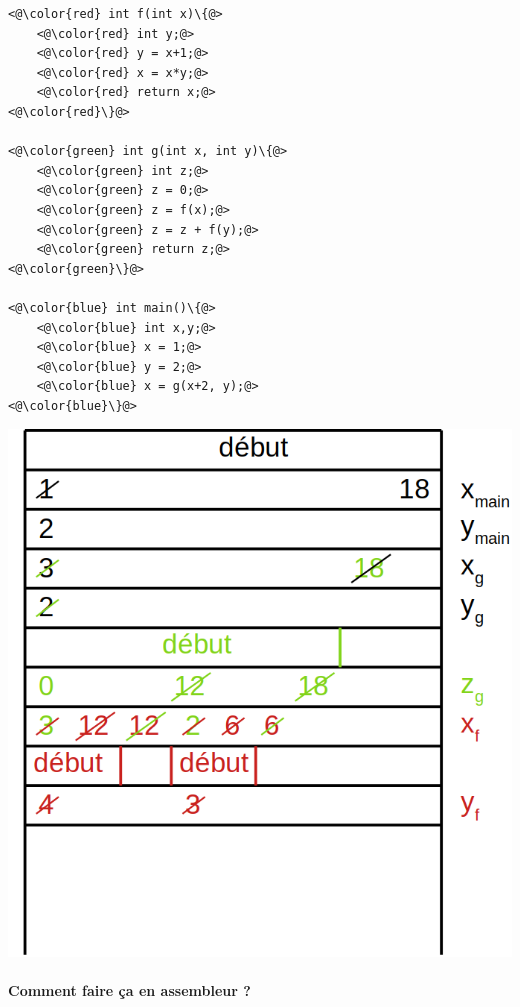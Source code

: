 \begin{minipage}{0.25\linewidth}
\begin{lstlisting}
<@\color{red} int f(int x)\{@>
    <@\color{red} int y;@>
    <@\color{red} y = x+1;@>
    <@\color{red} x = x*y;@>
    <@\color{red} return x;@>
<@\color{red}\}@>

<@\color{green} int g(int x, int y)\{@>
    <@\color{green} int z;@>
    <@\color{green} z = 0;@>
    <@\color{green} z = f(x);@>
    <@\color{green} z = z + f(y);@>
    <@\color{green} return z;@>
<@\color{green}\}@>

<@\color{blue} int main()\{@>
    <@\color{blue} int x,y;@>
    <@\color{blue} x = 1;@>
    <@\color{blue} y = 2;@>
    <@\color{blue} x = g(x+2, y);@>
<@\color{blue}\}@>
\end{lstlisting}
\end{minipage}\quad \begin{minipage}{0.70\linewidth}
\includegraphics[scale=0.4]{Developpements/pile d'appel/exemple_pile.png}
\end{minipage}

\paragraph{Comment faire ça en assembleur ?}

